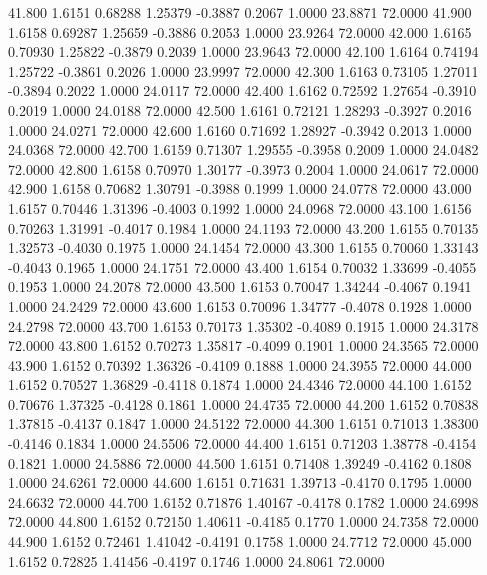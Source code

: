   41.800   1.6151   0.68288   1.25379  -0.3887   0.2067   1.0000  23.8871  72.0000
  41.900   1.6158   0.69287   1.25659  -0.3886   0.2053   1.0000  23.9264  72.0000
  42.000   1.6165   0.70930   1.25822  -0.3879   0.2039   1.0000  23.9643  72.0000
  42.100   1.6164   0.74194   1.25722  -0.3861   0.2026   1.0000  23.9997  72.0000
  42.300   1.6163   0.73105   1.27011  -0.3894   0.2022   1.0000  24.0117  72.0000
  42.400   1.6162   0.72592   1.27654  -0.3910   0.2019   1.0000  24.0188  72.0000
  42.500   1.6161   0.72121   1.28293  -0.3927   0.2016   1.0000  24.0271  72.0000
  42.600   1.6160   0.71692   1.28927  -0.3942   0.2013   1.0000  24.0368  72.0000
  42.700   1.6159   0.71307   1.29555  -0.3958   0.2009   1.0000  24.0482  72.0000
  42.800   1.6158   0.70970   1.30177  -0.3973   0.2004   1.0000  24.0617  72.0000
  42.900   1.6158   0.70682   1.30791  -0.3988   0.1999   1.0000  24.0778  72.0000
  43.000   1.6157   0.70446   1.31396  -0.4003   0.1992   1.0000  24.0968  72.0000
  43.100   1.6156   0.70263   1.31991  -0.4017   0.1984   1.0000  24.1193  72.0000
  43.200   1.6155   0.70135   1.32573  -0.4030   0.1975   1.0000  24.1454  72.0000
  43.300   1.6155   0.70060   1.33143  -0.4043   0.1965   1.0000  24.1751  72.0000
  43.400   1.6154   0.70032   1.33699  -0.4055   0.1953   1.0000  24.2078  72.0000
  43.500   1.6153   0.70047   1.34244  -0.4067   0.1941   1.0000  24.2429  72.0000
  43.600   1.6153   0.70096   1.34777  -0.4078   0.1928   1.0000  24.2798  72.0000
  43.700   1.6153   0.70173   1.35302  -0.4089   0.1915   1.0000  24.3178  72.0000
  43.800   1.6152   0.70273   1.35817  -0.4099   0.1901   1.0000  24.3565  72.0000
  43.900   1.6152   0.70392   1.36326  -0.4109   0.1888   1.0000  24.3955  72.0000
  44.000   1.6152   0.70527   1.36829  -0.4118   0.1874   1.0000  24.4346  72.0000
  44.100   1.6152   0.70676   1.37325  -0.4128   0.1861   1.0000  24.4735  72.0000
  44.200   1.6152   0.70838   1.37815  -0.4137   0.1847   1.0000  24.5122  72.0000
  44.300   1.6151   0.71013   1.38300  -0.4146   0.1834   1.0000  24.5506  72.0000
  44.400   1.6151   0.71203   1.38778  -0.4154   0.1821   1.0000  24.5886  72.0000
  44.500   1.6151   0.71408   1.39249  -0.4162   0.1808   1.0000  24.6261  72.0000
  44.600   1.6151   0.71631   1.39713  -0.4170   0.1795   1.0000  24.6632  72.0000
  44.700   1.6152   0.71876   1.40167  -0.4178   0.1782   1.0000  24.6998  72.0000
  44.800   1.6152   0.72150   1.40611  -0.4185   0.1770   1.0000  24.7358  72.0000
  44.900   1.6152   0.72461   1.41042  -0.4191   0.1758   1.0000  24.7712  72.0000
  45.000   1.6152   0.72825   1.41456  -0.4197   0.1746   1.0000  24.8061  72.0000

